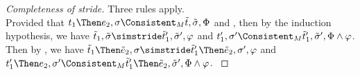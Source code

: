 \begin{proof}[Completeness of stride]
  {
  Three rules apply.\\
   {
     Provided that $t_1\Then e_2,\sigma\Consistent_M \tilde{t},\tilde{\sigma},\Phi$ and ,
     then by the induction hypothesis, we have $\tilde{t}_1,\tilde{\sigma}\simstride\tilde{t}_1',\tilde{\sigma}',\phi$
     and $t_1',\sigma'\Consistent_M\tilde{t}_1',\tilde{\sigma}',\Phi\land\phi$.
     Then by , we have $\tilde{t}_1\Then\tilde{e}_2,\sigma\simstride\tilde{t}_1'\Then\tilde{e}_2,\sigma',\phi$
     and $t_1'\Then e_2,\sigma'\Consistent_M\tilde{t}_1'\Then \tilde{e}_2,\tilde{\sigma}',\Phi\land\phi$.
  }
   {
   }
   {
   }
  }


\end{proof}
